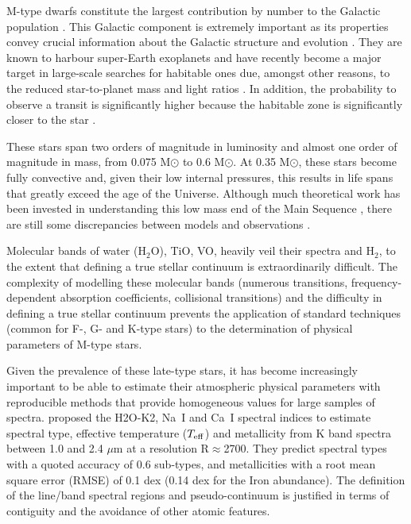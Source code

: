 
M-type dwarfs constitute the largest contribution by number to the
Galactic population \citep{2010AJ....139.2679B}. This Galactic
component is extremely important as its properties convey crucial
information about the Galactic structure and
evolution \citep{2013A&A...556A.110B}. They are known to harbour
super-Earth exoplanets \citep{2013A&A...556A.110B} and have recently
become a major target in large-scale searches for habitable ones due,
amongst other reasons, to the reduced star-to-planet mass and light
ratios \citep{2015A&A...577A.128A}. In addition, the probability to observe a
transit is significantly higher because the habitable zone is
significantly closer to the star \citep{Shields20161}.

These stars span two orders of magnitude in luminosity and almost one
order of magnitude in mass, from 0.075 M$\odot$ to 0.6 M$\odot$. At
0.35 M$\odot$, these stars become fully convective and, given their
low internal pressures, this results in life spans that greatly exceed
the age of the Universe. Although much theoretical work has been
invested in understanding this low mass end of the Main
Sequence \citep{2008ApJ...676.1262B}, there are still some
discrepancies between models and observations \citep[see e.g.][for an
account of the observed inflated radii and cooler temperatures with
respect to model predictions]{2013AN....334....4T}.

Molecular bands of water (H$_2$O), TiO, VO,
heavily veil their spectra and H$_2$, to the extent that defining a true stellar
continuum is extraordinarily difficult. The complexity of modelling
these molecular bands (numerous transitions, frequency-dependent
absorption coefficients, collisional transitions) and the difficulty in
defining a true stellar continuum prevents the application of standard
techniques (common for F-, G- and K-type stars) to the determination
of physical parameters of M-type stars.

Given the prevalence of these late-type stars, it has become
increasingly important to be able to estimate their atmospheric
physical parameters with reproducible methods that provide homogeneous
values for large samples of spectra. \cite{2012ApJ...748...93R}
proposed the H2O-K2, Na~{\sc I} and Ca~{\sc I} spectral indices to
estimate spectral type, effective temperature ($T_{\rm eff}$) and
metallicity from K band spectra between 1.0 and 2.4 $\mu$m at a
resolution R$\approx$2700. They predict spectral types with a quoted
accuracy of 0.6 sub-types, and metallicities with a root mean square
error (RMSE) of 0.1 dex (0.14 dex for the Iron abundance). The
definition of the line/band spectral regions and pseudo-continuum is
justified in terms of contiguity and the avoidance of other atomic
features. 

